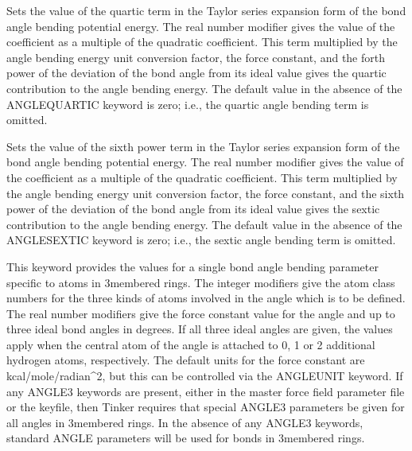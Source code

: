 \documentclass[letterpaper,11pt,english]{sphinxmanual}
\begin{document}
  Sets the value of the quartic term in the Taylor series expansion form of the bond angle bending potential energy. The real number modifier gives the value of the coefficient as a multiple of the quadratic coefficient. This term multiplied by the angle bending energy unit conversion factor, the force constant, and the forth power of the deviation of the bond angle from its ideal value gives the quartic contribution to the angle bending energy. The default value in the absence of the ANGLE\sphinxhyphen{}QUARTIC keyword is zero; i.e., the quartic angle bending term is omitted.

  Sets the value of the sixth power term in the Taylor series expansion form of the bond angle bending potential energy. The real number modifier gives the value of the coefficient as a multiple of the quadratic coefficient. This term multiplied by the angle bending energy unit conversion factor, the force constant, and the sixth power of the deviation of the bond angle from its ideal value gives the sextic contribution to the angle bending energy. The default value in the absence of the ANGLE\sphinxhyphen{}SEXTIC keyword is zero; i.e., the sextic angle bending term is omitted.

  This keyword provides the values for a single bond angle bending parameter specific to atoms in 3\sphinxhyphen{}membered rings. The integer modifiers give the atom class numbers for the three kinds of atoms involved in the angle which is to be defined. The real number modifiers give the force constant value for the angle and up to three ideal bond angles in degrees. If all three ideal angles are given, the values apply when the central atom of the angle is attached to 0, 1 or 2 additional hydrogen atoms, respectively. The default units for the force constant are kcal/mole/radian\textasciicircum{}2, but this can be controlled via the ANGLEUNIT keyword. If any ANGLE3 keywords are present, either in the master force field parameter file or the keyfile, then Tinker requires that special ANGLE3 parameters be given for all angles in 3\sphinxhyphen{}membered rings. In the absence of any ANGLE3 keywords, standard ANGLE parameters will be used for bonds in 3\sphinxhyphen{}membered rings.
\end{document}
